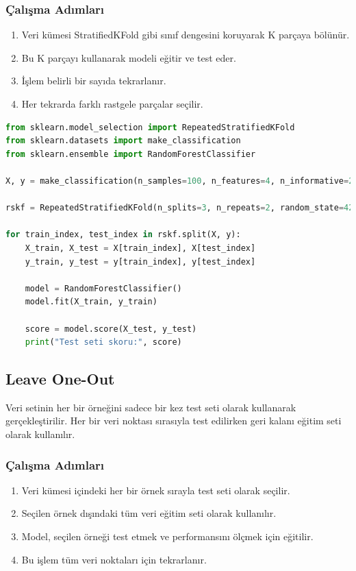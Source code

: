 \subsubsection{Çalışma Adımları}
\begin{enumerate}
    \item Veri kümesi StratifiedKFold gibi sınıf dengesini koruyarak K parçaya bölünür.
    \item Bu K parçayı kullanarak modeli eğitir ve test eder.
    \item İşlem belirli bir sayıda tekrarlanır.
    \item Her tekrarda farklı rastgele parçalar seçilir.
\end{enumerate}

\begin{lstlisting}[language=Python, caption=Scikit-learn'de Repeated Stratified KFold örneği.]
from sklearn.model_selection import RepeatedStratifiedKFold
from sklearn.datasets import make_classification
from sklearn.ensemble import RandomForestClassifier

X, y = make_classification(n_samples=100, n_features=4, n_informative=2, n_redundant=0, random_state=42, n_classes=2)

rskf = RepeatedStratifiedKFold(n_splits=3, n_repeats=2, random_state=42)

for train_index, test_index in rskf.split(X, y):
    X_train, X_test = X[train_index], X[test_index]
    y_train, y_test = y[train_index], y[test_index]
    
    model = RandomForestClassifier()
    model.fit(X_train, y_train)
    
    score = model.score(X_test, y_test)
    print("Test seti skoru:", score)
\end{lstlisting}


\subsection{Leave One-Out}
Veri setinin her bir örneğini sadece bir kez test seti olarak kullanarak gerçekleştirilir. Her bir veri noktası sırasıyla test edilirken geri kalanı eğitim seti olarak kullanılır.

\subsubsection{Çalışma Adımları}
\begin{enumerate}
    \item Veri kümesi içindeki her bir örnek sırayla test seti olarak seçilir.
    \item Seçilen örnek dışındaki tüm veri eğitim seti olarak kullanılır.
    \item Model, seçilen örneği test etmek ve performansını ölçmek için eğitilir.
    \item Bu işlem tüm veri noktaları için tekrarlanır.
\end{enumerate}

